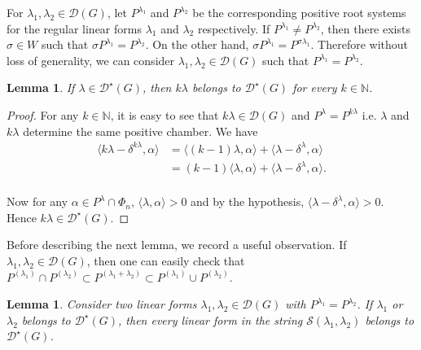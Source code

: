 \documentclass[11 pt]{amsart}
\newcommand{\N}{{\mathbb N}}
\newtheorem{lemma}[theorem]{Lemma}
\theoremstyle{definition}
\numberwithin{equation}{section}
\begin{document}
For $\lambda_1 , \lambda_2 \in \mathcal{D}(G)$, let $P^{\lambda_1}$ and $P^{\lambda_2}$ be the corresponding positive root systems for the regular linear forms $\lambda_1$ and $\lambda_2$ respectively. If $P^{\lambda_1} \neq P^{\lambda_2}$, then there exists $\sigma \in W$ such that $\sigma P^{\lambda_1} =P^{\lambda_2}$. On the other hand, $\sigma P^{\lambda_1} = P^{\sigma \lambda_1}$. Therefore without loss of generality, we can consider $\lambda_1, \lambda_2 \in \mathcal{D}(G)$ such that $P^{\lambda_1} = P^{\lambda_2}$. 

\begin{lemma}
\textit{If $\lambda \in \mathcal{D}^{\star}(G)$, then $k \lambda$ belongs to $\mathcal{D}^{\star}(G)$ for every $k \in \N$.}
\end{lemma}

\begin{proof}
For any $k \in \N$, it is easy to see that $k \lambda \in \mathcal{D}(G)$ and $P^{\lambda} = P^{k \lambda}$ i.e. $\lambda$ and $k \lambda$ determine the same positive chamber. We have
\vspace{2pt}
\begin{equation}
\begin{split}
 \langle k \lambda - \delta^{k \lambda}, \alpha \rangle
& = \langle (k-1) \lambda , \alpha \rangle + \langle \lambda - \delta^{\lambda}, \alpha \rangle \\
& = (k-1) \langle \lambda , \alpha \rangle + \langle \lambda - \delta^{\lambda}, \alpha \rangle.\\ 
\end{split}
\end{equation}

\noindent Now for any $\alpha \in P^{\lambda} \cap \Phi_n$, $\langle \lambda , \alpha \rangle > 0$ and by the hypothesis, $\langle \lambda - \delta^{\lambda}, \alpha \rangle > 0$. Hence $k \lambda \in \mathcal{D}^{\star}(G)$. 
\end{proof}

Before describing the next lemma, we record a useful observation. If $\lambda_1, \lambda_2 \in \mathcal{D}(G)$, then one can easily check that $P^{(\lambda_1)} \cap P^{(\lambda_2)} \subset P^{(\lambda_1 + \lambda_2)} \subset P^{(\lambda_1)} \cup P^{(\lambda_2)}$. 

\begin{lemma}\label{lemma2.4.3}
\textit{Consider two linear forms $\lambda_1, \lambda_2 \in \mathcal{D}(G)$ with $P^{\lambda_1}=P^{\lambda_2}$. If $\lambda_1$ or $\lambda_2$ belongs to $\mathcal{D}^{\star}(G)$, then every linear form in the string $\mathcal{S}(\lambda_1, \lambda_2)$ belongs to $\mathcal{D}^{\star}(G)$.} 
\end{lemma}
\end{document}
